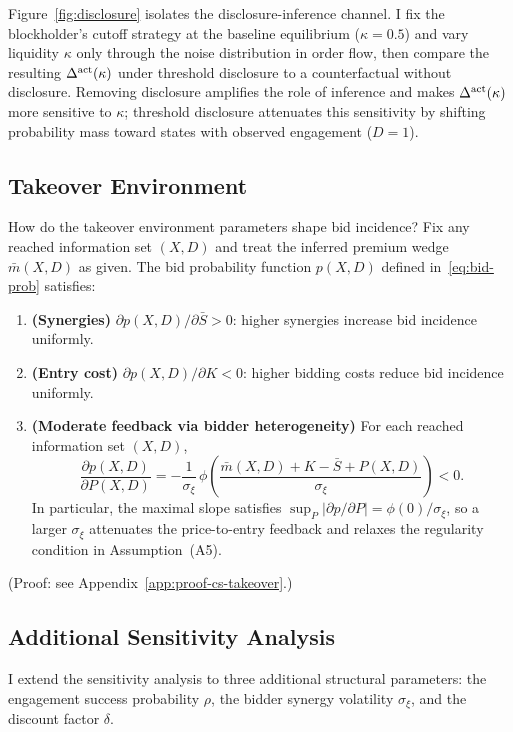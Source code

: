 \documentclass[11pt]{article}
\newcommand{\1}{\mathbf{1}}
\begin{document}
Figure~\ref{fig:disclosure} isolates the disclosure-inference channel. I fix the blockholder's cutoff strategy at the baseline equilibrium ($\kappa=0.5$) and vary liquidity $\kappa$ only through the noise distribution in order flow, then compare the resulting $\Delta^{\textup{act}}(\kappa)$ under threshold disclosure to a counterfactual without disclosure. Removing disclosure amplifies the role of inference and makes $\Delta^{\textup{act}}(\kappa)$ more sensitive to $\kappa$; threshold disclosure attenuates this sensitivity by shifting probability mass toward states with observed engagement ($D=1$).

%
\subsection{Takeover Environment}
%

How do the takeover environment parameters shape bid incidence? Fix any reached information set $(X,D)$ and treat the inferred premium wedge $\bar{m}(X,D)$ as given. The bid probability function $p(X,D)$ defined in~\eqref{eq:bid-prob} satisfies:
\begin{enumerate}[label=\textup{(\alph*)},leftmargin=2em]
\item \textbf{(Synergies)} $\partial p(X,D) / \partial \bar{S} > 0$: higher synergies increase bid incidence uniformly.
\item \textbf{(Entry cost)} $\partial p(X,D) / \partial K < 0$: higher bidding costs reduce bid incidence uniformly.
\item \textbf{(Moderate feedback via bidder heterogeneity)} For each reached information set $(X,D)$,
\[
\frac{\partial p(X,D)}{\partial P(X,D)}=-\frac{1}{\sigma_\xi}\,\phi\!\left(\frac{\bar{m}(X,D)+K-\bar{S}+P(X,D)}{\sigma_\xi}\right)<0.
\]
In particular, the maximal slope satisfies $\sup_{P}\bigl|\partial p/\partial P\bigr|=\phi(0)/\sigma_\xi$, so a larger $\sigma_\xi$ attenuates the price-to-entry feedback and relaxes the regularity condition in Assumption~\textup{(A5)}.
\end{enumerate}
(Proof: see Appendix~\ref{app:proof-cs-takeover}.)

%
\subsection{Additional Sensitivity Analysis}
%

I extend the sensitivity analysis to three additional structural parameters: the engagement success probability $\rho$, the bidder synergy volatility $\sigma_\xi$, and the discount factor $\delta$.
\end{document}
